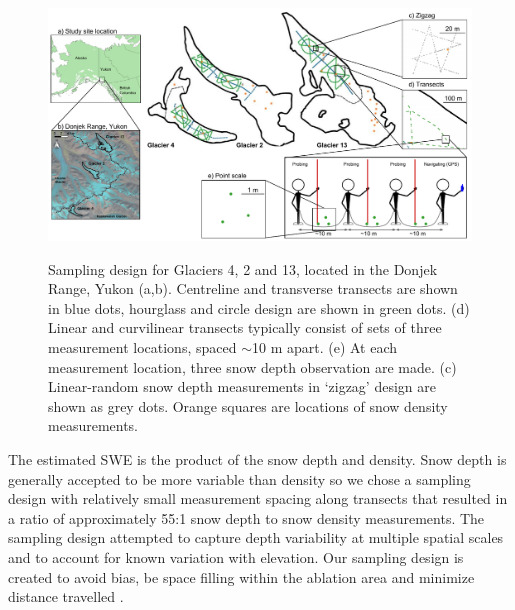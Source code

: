 \documentclass[review,oneside, letterpaper]{igs}
\begin{document}
\begin{figure}
	\centering
	\includegraphics[width =\textwidth]{Sampling.pdf}\\
	\caption{Sampling design for Glaciers 4, 2 and 13, located in the Donjek Range, Yukon (a,b). Centreline and transverse transects are shown in blue dots, hourglass and circle design are shown in green dots. (d) Linear and curvilinear transects typically consist of sets of three measurement locations, spaced $\sim$10 m apart. (e) At each measurement location, three snow depth observation are made. (c) Linear-random snow depth measurements in `zigzag' design are shown as grey dots. Orange squares are locations of snow density measurements. }
	\label{fig:Sampling}
\end{figure}

The estimated SWE is the product of the snow depth and density. Snow depth is generally accepted to be more variable than density \citep{Elder1991, Clark2011, Lopez2013} so we chose a sampling design with relatively small measurement spacing along transects that resulted in a ratio of approximately 55:1 snow depth to snow density measurements. The sampling design attempted to capture depth variability at multiple spatial scales and to account for known variation with elevation. Our sampling design is created to avoid bias, be space filling within the ablation area and minimize distance travelled \citep{Shea2010}.
\end{document}
